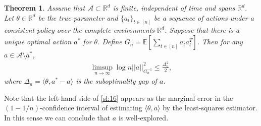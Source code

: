\documentclass[10pt,a4article]{amsart}
\numberwithin{equation}{section}
\theoremstyle{plain}
\newtheorem{Th}{Theorem}
\theoremstyle{definition}
\def\R{{\mathbb R}}
\def\E{{\mathbb E}}
\def\R{{\mathbb R}}
\def\t{{\theta}}
\begin{document}
\begin{Th}\label{sl:asym}
Assume that $\mathcal A\subset\R^d$ is finite, independent of time and spans $\R^d$. Let $\t\in\R^d$ be the true parameter and $\{a_t\}_{t\in [n]}$ be a sequence of actions under a consistent policy over the complete environments $\R^d$. Suppose that there is a unique optimal action $a^*$ for $\t$. Define $\bar{G}_n = \E[\sum_{t\in [n]}a_ta_t^T]$. Then for any $a\in\mathcal A\setminus a^*$, 
\begin{align}
\limsup_{n\to\infty}\log n ||a||^2_{G_n^{-1}}\leq\frac{\Delta_a^2}{2}, \label{sl:16}
\end{align} 
where $\Delta_a = \langle\t, a^*-a\rangle$ is the suboptimality gap of $a$. 
\end{Th}
Note that the left-hand side of \eqref{sl:16} appears as the marginal error in the $(1-1/n)$-confidence interval of estimating $\langle\t, a\rangle$ by the least-squares estimator. In this sense we can conclude that $a$ is well-explored. 
\end{document}
